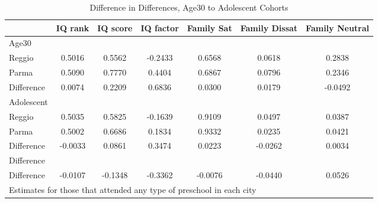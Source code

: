 \begin{table}[htbp]\centering
\caption{Difference in Differences, Age30 to Adolescent Cohorts}
\begin{tabular}{l*{6}{c}}
\hline\hline
            &     IQ rank&    IQ score&   IQ factor&  Family Sat&Family Dissat&Family Neutral\\
\hline
Age30       &            &            &            &            &            &            \\
Reggio      &      0.5016&      0.5562&     -0.2433&      0.6568&      0.0618&      0.2838\\
Parma       &      0.5090&      0.7770&      0.4404&      0.6867&      0.0796&      0.2346\\
Difference  &      0.0074&      0.2209&      0.6836&      0.0300&      0.0179&     -0.0492\\
\hline
Adolescent  &            &            &            &            &            &            \\
Reggio      &      0.5035&      0.5825&     -0.1639&      0.9109&      0.0497&      0.0387\\
Parma       &      0.5002&      0.6686&      0.1834&      0.9332&      0.0235&      0.0421\\
Difference  &     -0.0033&      0.0861&      0.3474&      0.0223&     -0.0262&      0.0034\\
\hline
Difference  &            &            &            &            &            &            \\
Difference  &     -0.0107&     -0.1348&     -0.3362&     -0.0076&     -0.0440&      0.0526\\
\hline\hline
\multicolumn{7}{l}{\footnotesize Estimates for those that attended any type of preschool in each city}\\
\end{tabular}
\end{table}
